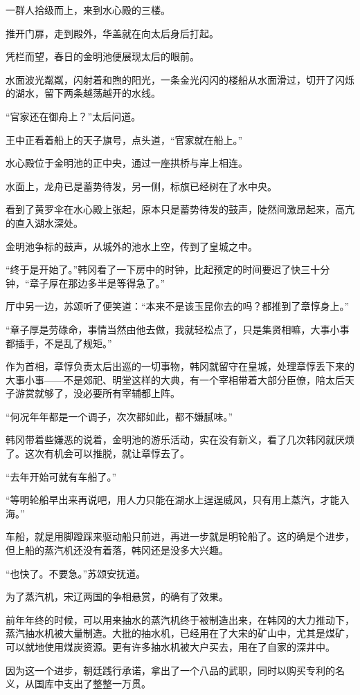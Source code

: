 一群人拾级而上，来到水心殿的三楼。

推开门扉，走到殿外，华盖就在向太后身后打起。

凭栏而望，春日的金明池便展现太后的眼前。

水面波光粼粼，闪射着和煦的阳光，一条金光闪闪的楼船从水面滑过，切开了闪烁的湖水，留下两条越荡越开的水线。

“官家还在御舟上？”太后问道。

王中正看着船上的天子旗号，点头道，“官家就在船上。”

水心殿位于金明池的正中央，通过一座拱桥与岸上相连。

水面上，龙舟已是蓄势待发，另一侧，标旗已经树在了水中央。

看到了黄罗伞在水心殿上张起，原本只是蓄势待发的鼓声，陡然间激昂起来，高亢的直入湖水深处。

金明池争标的鼓声，从城外的池水上空，传到了皇城之中。

“终于是开始了。”韩冈看了一下房中的时钟，比起预定的时间要迟了快三十分钟，“章子厚在那边多半是等得急了。”

厅中另一边，苏颂听了便笑道：“本来不是该玉昆你去的吗？都推到了章惇身上。”

“章子厚是劳碌命，事情当然由他去做，我就轻松点了，只是集贤相嘛，大事小事都插手，不是乱了规矩。”

作为首相，章惇负责太后出巡的一切事物，韩冈就留守在皇城，处理章惇丢下来的大事小事——不是郊祀、明堂这样的大典，有一个宰相带着大部分臣僚，陪太后天子游赏就够了，没必要所有宰辅都上阵。

“何况年年都是一个调子，次次都如此，都不嫌腻味。”

韩冈带着些嫌恶的说着，金明池的游乐活动，实在没有新义，看了几次韩冈就厌烦了。这次有机会可以推脱，就让章惇去了。

“去年开始可就有车船了。”

“等明轮船早出来再说吧，用人力只能在湖水上逞逞威风，只有用上蒸汽，才能入海。”

车船，就是用脚蹬踩来驱动船只前进，再进一步就是明轮船了。这的确是个进步，但上船的蒸汽机还没有着落，韩冈还是没多大兴趣。

“也快了。不要急。”苏颂安抚道。

为了蒸汽机，宋辽两国的争相悬赏，的确有了效果。

前年年终的时候，可以用来抽水的蒸汽机终于被制造出来，在韩冈的大力推动下，蒸汽抽水机被大量制造。大批的抽水机，已经用在了大宋的矿山中，尤其是煤矿，可以就地使用煤炭资源。更有许多抽水机被大户买去，用在了自家的深井中。

因为这一个进步，朝廷践行承诺，拿出了一个八品的武职，同时以购买专利的名义，从国库中支出了整整一万贯。

